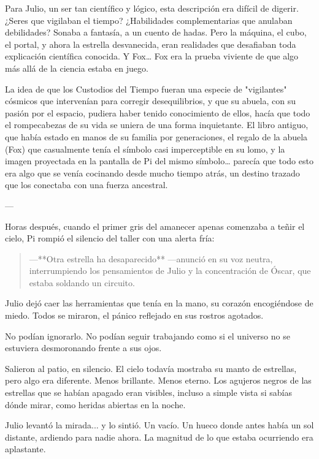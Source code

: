 \documentclass[a4paper,12pt]{book}
\begin{document}
Para Julio, un ser tan científico y lógico, esta descripción era difícil de digerir. ¿Seres que vigilaban el tiempo? ¿Habilidades complementarias que anulaban debilidades? Sonaba a fantasía, a un cuento de hadas. Pero la máquina, el cubo, el portal, y ahora la estrella desvanecida, eran realidades que desafiaban toda explicación científica conocida. Y Fox… Fox era la prueba viviente de que algo más allá de la ciencia estaba en juego.

La idea de que los Custodios del Tiempo fueran una especie de "vigilantes" cósmicos que intervenían para corregir desequilibrios, y que su abuela, con su pasión por el espacio, pudiera haber tenido conocimiento de ellos, hacía que todo el rompecabezas de su vida se uniera de una forma inquietante. El libro antiguo, que había estado en manos de su familia por generaciones, el regalo de la abuela (Fox) que casualmente tenía el símbolo casi imperceptible en su lomo, y la imagen proyectada en la pantalla de Pi del mismo símbolo… parecía que todo esto era algo que se venía cocinando desde mucho tiempo atrás, un destino trazado que los conectaba con una fuerza ancestral.

---

Horas después, cuando el primer gris del amanecer apenas comenzaba a teñir el cielo, Pi rompió el silencio del taller con una alerta fría:

\begin{quote}
    —**Otra estrella ha desaparecido** —anunció en su voz neutra, interrumpiendo los pensamientos de Julio y la concentración de Óscar, que estaba soldando un circuito.
\end{quote}

Julio dejó caer las herramientas que tenía en la mano, su corazón encogiéndose de miedo. Todos se miraron, el pánico reflejado en sus rostros agotados.

No podían ignorarlo. No podían seguir trabajando como si el universo no se estuviera desmoronando frente a sus ojos.

Salieron al patio, en silencio. El cielo todavía mostraba su manto de estrellas, pero algo era diferente. Menos brillante. Menos eterno. Los agujeros negros de las estrellas que se habían apagado eran visibles, incluso a simple vista si sabías dónde mirar, como heridas abiertas en la noche.

Julio levantó la mirada... y lo sintió. Un vacío. Un hueco donde antes había un sol distante, ardiendo para nadie ahora. La magnitud de lo que estaba ocurriendo era aplastante.
\end{document}
